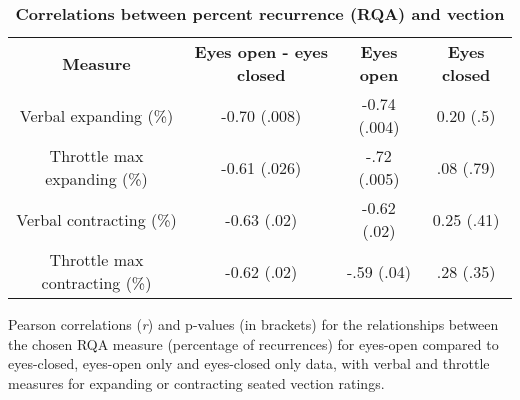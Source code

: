 \documentclass[11pt]{article}
\begin{document}
 \begin{table}[!ht]
\caption{
\bf{Correlations between percent recurrence (RQA) and vection}}
\begin{tabular}{|c|c|c|c|}
{\bf Measure} & {\bf Eyes open - eyes closed} & {\bf Eyes open}  & {\bf Eyes closed}\\ 
Verbal expanding (\%) & -0.70 (.008) &  -0.74 (.004) & 0.20 (.5) \\
Throttle max expanding (\%) &  -0.61 (.026)  & -.72 (.005) & .08 (.79)\\
Verbal contracting (\%) & -0.63 (.02) &  -0.62 (.02) & 0.25 (.41) \\
Throttle max contracting (\%) &  -0.62 (.02)  & -.59 (.04) & .28 (.35)\\

\end{tabular}
\begin{flushleft} Pearson correlations (\emph{r}) and p-values (in brackets) for the relationships between the chosen RQA measure (percentage of recurrences) for eyes-open compared to eyes-closed, eyes-open only and eyes-closed only data, with verbal and throttle measures for expanding or contracting seated vection ratings. 
\end{flushleft}
\label{Table_2}
 \end{table}
 
\end{document}
